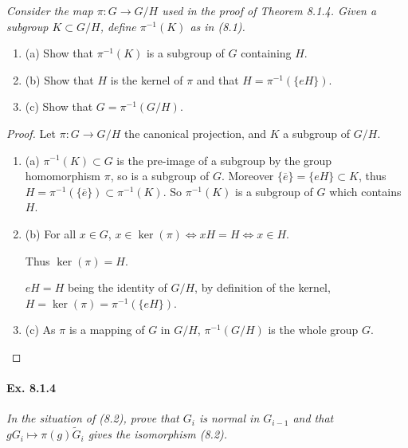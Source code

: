 \documentclass[11pt,a4paper]{article}
\newcommand{\be} {\begin{enumerate}}
\newcommand{\ee} {\end{enumerate}}
\begin{document}
{\it Consider the map $\pi : G \to G/H$ used in the proof of Theorem 8.1.4. Given a subgroup $K \subset G/H$, define $\pi^{-1}(K)$ as in (8.1).
\be
\item[(a)] Show that $\pi^{-1}(K)$ is a subgroup of $G$ containing $H$.
\item[(b)] Show that $H$ is the kernel of $\pi$ and that $H = \pi^{-1}(\{eH\})$.
\item[(c)] Show that $G = \pi^{-1}(G/H)$.
\ee
}

\begin{proof}
Let $\pi : G \to G/H$ the canonical projection, and $K$ a subgroup of $G/H$.


\be
\item[(a)] $\pi^{-1}(K) \subset G$ is the pre-image of  a subgroup by  the group homomorphism $\pi$, so is a subgroup of $G$.
Moreover $\{\overline{e}\} = \{eH\} \subset K$, thus $H = \pi^{-1}(\{\overline{e}\}) \subset \pi^{-1}(K)$. So $\pi^{-1}(K)$ is a subgroup of $G$ which contains $H$.


\item[(b)] For all $x\in G$, $x \in \ker(\pi) \iff xH = H \iff x \in H$.

Thus $\ker(\pi) = H$.

$eH=H$ being the identity of $G/H$, by definition of the kernel, $H = \ker(\pi) = \pi^{-1}(\{eH\})$.

\item[(c)] As $\pi$ is a mapping of $G$ in $G/H$, $\pi^{-1}(G/H)$ is the whole group $G$.
\ee
\end{proof}

\paragraph{Ex. 8.1.4}

{\it In the situation of (8.2), prove that $G_i$ is normal in $G_{i-1}$ and that ${gG_i \mapsto \pi(g) \tilde{G}_i}$ gives the isomorphism (8.2).
}
\end{document}
